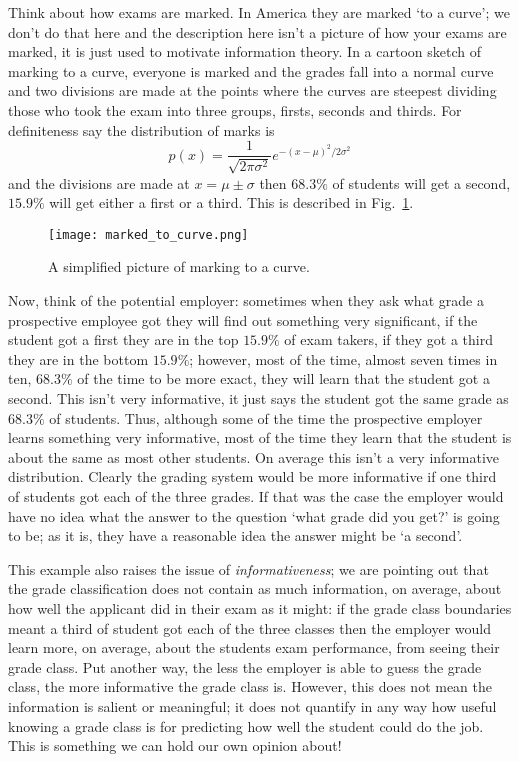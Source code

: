 \documentclass[12pt]{article}
\begin{document}
Think about how exams are marked. In America they are marked \lq{}to a
curve\rq{}; we don't do that here and the description here isn't a
picture of how your exams are marked, it is just used to motivate
information theory. In a cartoon sketch of marking to a curve,
everyone is marked and the grades fall into a normal curve and two
divisions are made at the points where the curves are steepest
dividing those who took the exam into three groups, firsts, seconds
and thirds. For definiteness say the distribution of marks is 
\begin{equation}
p(x)=\frac{1}{\sqrt{2\pi\sigma^2}}e^{-(x-\mu)^2/2\sigma^2}
\end{equation}
and the divisions are made at $x=\mu\pm\sigma$ then $68.3\%$ of
students will get a second, $15.9\%$ will get either a first or a
third. This is described in Fig.~\ref{fig_marking_to_a_curve}.

\begin{figure}
\begin{center}
\texttt{[image: marked\_to\_curve.png]}
\end{center}
\caption{A simplified picture of marking to a curve.\label{fig_marking_to_a_curve}}
\end{figure}

Now, think of the potential employer: sometimes when they ask what
grade a prospective employee got they will find out something very
significant, if the student got a first they are in the top $15.9\%$
of exam takers, if they got a third they are in the bottom $15.9\%$;
however, most of the time, almost seven times in ten, $68.3\%$ of the
time to be more exact, they will learn that the student got a
second. This isn't very informative, it just says the student got the
same grade as $68.3\%$ of students. Thus, although some of the time
the prospective employer learns something very informative, most of
the time they learn that the student is about the same as most other
students. On average this isn't a very informative
distribution. Clearly the grading system would be more informative if
one third of students got each of the three grades. If that was the
case the employer would have no idea what the answer to the question
\lq{}what grade did you get?\rq{} is going to be; as it is, they have
a reasonable idea the answer might be \lq{}a second\rq{}.

This example also raises the issue of \textsl{informativeness}; we are
pointing out that the grade classification does not contain as much
information, on average, about how well the applicant did in their
exam as it might: if the grade class boundaries meant a third of
student got each of the three classes then the employer would learn
more, on average, about the students exam performance, from seeing
their grade class. Put another way, the less the employer is able to
guess the grade class, the more informative the grade class
is. However, this does not mean the information is salient or
meaningful; it does not quantify in any way how useful knowing a grade
class is for predicting how well the student could do the job. This is
something we can hold our own opinion about!
\end{document}
